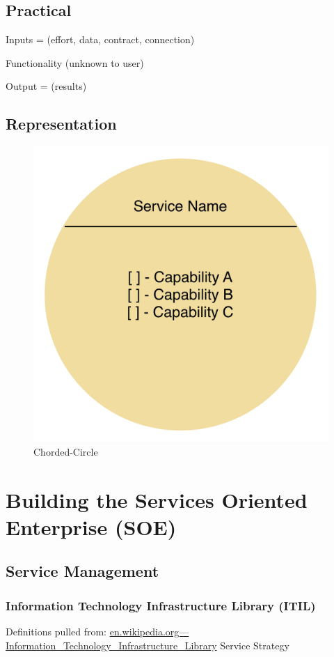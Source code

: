 \documentclass{article}
\begin{document}
\subsection{Practical}
Inputs = (effort, data, contract, connection)

Functionality (unknown to user)

Output = (results)

\subsection{Representation}



\begin{figure}
\includegraphics{Chorded-Circle.png}
\caption{Chorded-Circle}
\label{fig:att0}
\end{figure}
\section{Building the Services Oriented Enterprise (SOE)}
\subsection{Service Management}
\subsubsection{Information Technology Infrastructure Library (ITIL)}
Definitions pulled from: 
\href{http://en.wikipedia.org/wiki/Information\_Technology\_Infrastructure\_Library}{en.wikipedia.org—Information\_Technology\_Infrastructure\_Library}
Service Strategy
\end{document}
